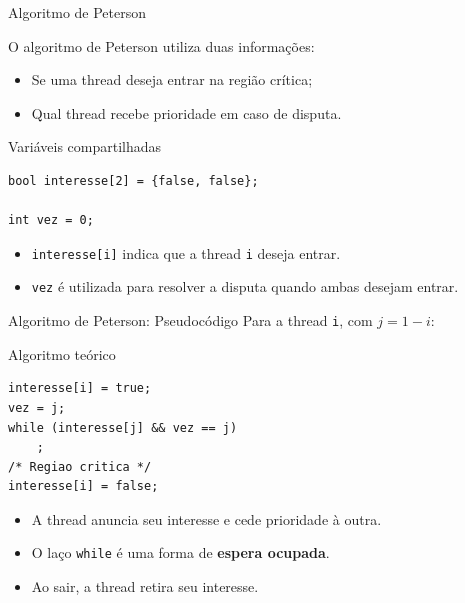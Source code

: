 \documentclass[aspectratio=169,11pt]{beamer}
\begin{document}
\begin{frame}[fragile]{Algoritmo de Peterson}

O algoritmo de Peterson utiliza duas informações:

\begin{itemize}
    \item Se uma thread deseja entrar na região crítica;

    \item Qual thread recebe prioridade em caso
          de disputa.
\end{itemize}

\vspace{0.3cm}

\begin{block}{Variáveis compartilhadas}

\begin{verbatim}
bool interesse[2] = {false, false};

int vez = 0;
\end{verbatim}

\end{block}

\vspace{0.3cm}

\begin{itemize}
    \item \texttt{interesse[i]} indica que a thread
          \texttt{i} deseja entrar.

    \item \texttt{vez} é utilizada para resolver
          a disputa quando ambas desejam entrar.
\end{itemize}

\end{frame}



\begin{frame}[fragile]{Algoritmo de Peterson: Pseudocódigo}
\small
Para a thread \texttt{i}, com \(j=1-i\):
\begin{block}{Algoritmo teórico}
\begin{verbatim}
interesse[i] = true;
vez = j;
while (interesse[j] && vez == j)
    ;
/* Regiao critica */
interesse[i] = false;
\end{verbatim}
\end{block}
\begin{itemize}
\item A thread anuncia seu interesse e cede prioridade à outra.
\item O laço \texttt{while} é uma forma de \textbf{espera ocupada}.
\item Ao sair, a thread retira seu interesse.
\end{itemize}
\end{frame}
\end{document}
